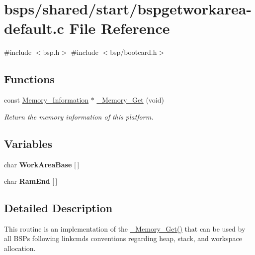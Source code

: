\hypertarget{bspgetworkarea-default_8c}{}\section{bsps/shared/start/bspgetworkarea-\/default.c File Reference}
\label{bspgetworkarea-default_8c}
{\ttfamily \#include $<$bsp.\+h$>$}\newline
{\ttfamily \#include $<$bsp/bootcard.\+h$>$}\newline
\subsection*{Functions}
\begin{DoxyCompactItemize}
\item 
const \mbox{\hyperlink{structMemory__Information}{Memory\+\_\+\+Information}} $\ast$ \mbox{\hyperlink{group__RTEMSScoreMemory_gaec9f82588542ae89940517c48f0208f6}{\+\_\+\+Memory\+\_\+\+Get}} (void)
\begin{DoxyCompactList}\small\item\em Return the memory information of this platform. \end{DoxyCompactList}\end{DoxyCompactItemize}
\subsection*{Variables}
\begin{DoxyCompactItemize}
\item 
\mbox{\label{bspgetworkarea-default_8c_a7b667244943e86167f801f19021d7b87}} 
char {\bfseries Work\+Area\+Base} \mbox{[}$\,$\mbox{]}
\item 
\mbox{\label{bspgetworkarea-default_8c_a48df72d46c421ff90a95379e0459f25c}} 
char {\bfseries Ram\+End} \mbox{[}$\,$\mbox{]}
\end{DoxyCompactItemize}


\subsection{Detailed Description}
This routine is an implementation of the \mbox{\hyperlink{group__RTEMSScoreMemory_gaec9f82588542ae89940517c48f0208f6}{\+\_\+\+Memory\+\_\+\+Get()}} that can be used by all B\+S\+Ps following linkcmds conventions regarding heap, stack, and workspace allocation. 